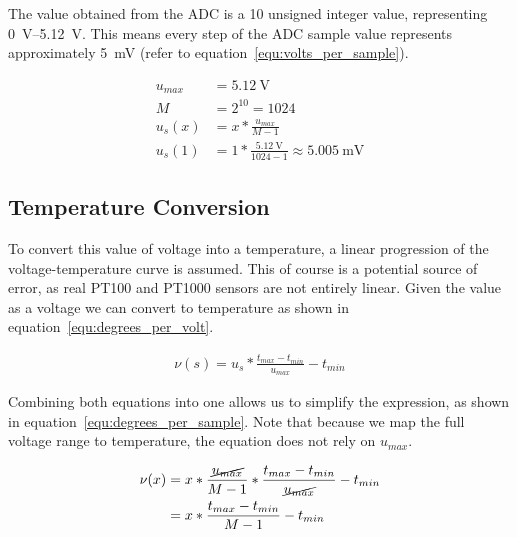 The value obtained from the ADC is a \SI{10}{\bit} unsigned integer value, representing \SIrange[range-units=single]{0}{5.12}{\volt}. This means every step of the ADC sample value represents approximately \SI{5}{\milli\volt} (refer to equation~\ref{equ:volts_per_sample}).

\begin{equation}\label{equ:volts_per_sample}
    \begin{split}
        u_{max} & = \SI{5.12}{\volt} \\
        M & = 2^{10} = 1024 \\
        u_{s}(x) & = x * \frac{u_{max}}{M - 1} \\
        u_{s}(1) & = 1 * \frac{\SI{5.12}{\volt}}{1024 - 1} \approx \SI{5.005}{\milli\volt}
    \end{split}
\end{equation}

\subsection{Temperature Conversion}

To convert this value of voltage into a temperature, a linear progression of the voltage-temperature curve is assumed. This of course is a potential source of error, as real PT100 and PT1000 sensors are not entirely linear. Given the value as a voltage we can convert to temperature as shown in equation~\ref{equ:degrees_per_volt}.

\begin{equation}\label{equ:degrees_per_volt}
    \begin{split}
        \nu(s) = u_{s} * \frac{t_{max} - t_{min}}{u_{max}} - t_{min}
    \end{split}
\end{equation}

Combining both equations into one allows us to simplify the expression, as shown in equation~\ref{equ:degrees_per_sample}. Note that because we map the full voltage range to temperature, the equation does not rely on \(u_{max}\).

\begin{equation}\label{equ:degrees_per_sample}
    \begin{split}
        \nu(x) & = x * \frac{\cancel{u_{max}}}{M - 1} * \frac{t_{max} - t_{min}}{\cancel{u_{max}}} - t_{min} \\
        & = x * \frac{t_{max} - t_{min}}{M - 1} - t_{min} \\
    \end{split}
\end{equation}

